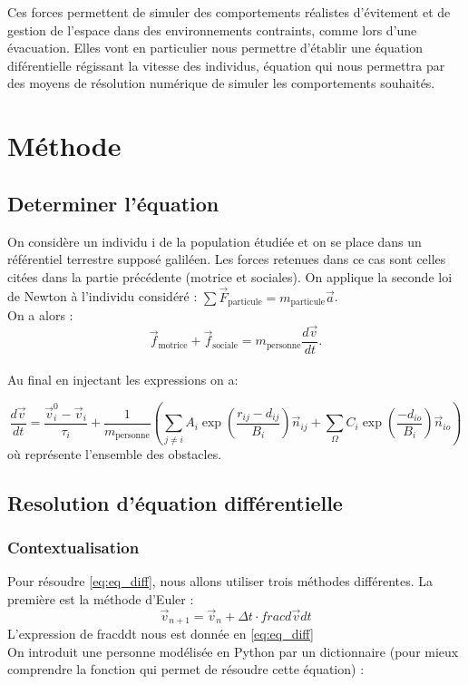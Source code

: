 \documentclass[a4paper,12pt]{article}
\begin{document}
Ces forces permettent de simuler des comportements réalistes d’évitement et de gestion de l’espace dans des environnements contraints, comme lors d’une évacuation. Elles vont en particulier nous permettre d'établir une équation diférentielle régissant la vitesse des individus, équation qui nous permettra par des moyens de résolution numérique de simuler les comportements souhaités.


\section{Méthode}

\subsection{Determiner l'équation}

\indent On considère un individu i de la population étudiée et on se place dans un référentiel terrestre supposé galiléen. Les forces retenues dans ce cas sont celles citées dans la partie précédente (motrice et sociales). On applique la seconde loi de Newton à l'individu considéré : $\sum \vec{F}_{\text{particule}} = m_{\text{particule}} \vec{a}$.
\\On a alors :
\[
\vec{f}_{\text{motrice}} + \vec{f}_{\text{sociale}} = m_{\text{personne}} \frac{d\vec{v}}{dt}.
\]
\\ Au final en injectant les expressions on a:

\begin{equation}
\label{eq:eq_diff}
\frac{d\vec{v}}{dt} = \frac{\vec{v}_i^0 - \vec{v}_i}{\tau_i} + \frac{1}{m_{\text{personne}}}( \sum_{j \neq i}  A_i \exp\left( \frac{r_{ij} - d_{ij}}{B_i} \right) \vec{n}_{ij} +  \sum_{\Omega} C_i \exp\left( \frac{- d_{io}}{B_i} \right) \vec{n}_{io})
\end{equation}
où \Omega représente l'ensemble des obstacles.

\subsection{Resolution d'équation différentielle}
\subsubsection{Contextualisation}

\indent Pour résoudre \eqref{eq:eq_diff}, nous allons utiliser trois méthodes différentes. La première est la méthode d'Euler : 
\[
\vec{v}_{n+1} = \vec{v}_n + \Delta t \cdot frac{d\vec{v}}{dt}
\]
L'expression de frac{d}{dt} nous est donnée en \eqref{eq:eq_diff}
\\ On introduit une personne modélisée en Python par un dictionnaire (pour mieux comprendre  la fonction qui permet de résoudre cette équation) :
\end{document}
